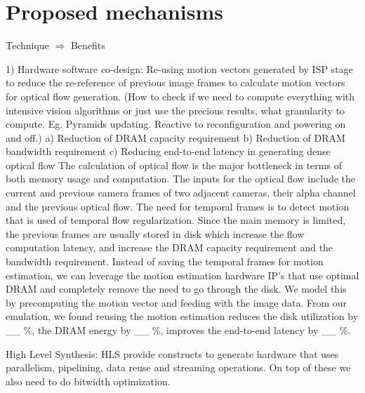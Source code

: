 \chapter{Proposed mechanisms} %

	Technique $\Rightarrow$ Benefits  \newline

1) Hardware software co-design: Re-using motion vectors generated by ISP stage to reduce the re-reference of previous image frames to calculate motion vectors for optical flow generation.\newline
(How to check if we need to compute everything with intensive vision algorithms or just use the precious results, what granularity to compute. Eg. Pyramids updating. Reactive to reconfiguration and powering on and off.)\newline
	a) Reduction of DRAM capacity requirement\newline
	b) Reduction of DRAM bandwidth requirement\newline
	c) Reducing end-to-end latency in generating dense optical flow \newline
The calculation of optical flow is the major bottleneck in terms of both memory usage and computation. The inputs for the optical flow include the current and previous camera frames of two adjacent cameras, their alpha channel and the previous optical flow. The need for temporal frames is to detect motion that is used of temporal flow regularization. Since the main memory is limited, the previous frames are usually stored in disk which increase the flow computation latency, and increase the DRAM capacity requirement and the bandwidth requirement. Instead of saving the temporal frames  for motion estimation, we can leverage the motion estimation hardware IP's that use optimal DRAM and completely remove the need to go through the disk. We model this by precomputing the motion vector and feeding with the image data. From our emulation, we found reusing the motion estimation reduces the disk utilization by \_\_ \%, the DRAM energy by \_\_ \%, improves the end-to-end latency by \_\_ \%. 
\newline

High Level Synthesis: HLS provide constructs to generate hardware that uses parallelism, pipelining, data reuse and streaming operations. On top of these we also need to do bitwidth optimization. 

